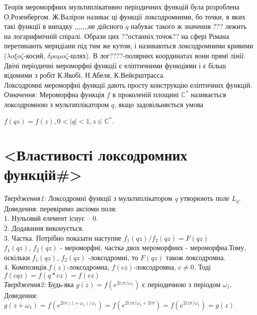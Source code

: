 \documentclass[12pt,a4paper]{article}
\begin{document}
Теорія мероморфних мультиплікативно періодичних функцій була розроблена О.Розенбергом. Ж.Валірон називає ці функції локсодромними, бо точки, в яких такі функції в випадку ,,,,,,,не дійсного $q$ набуває такого ж значення ??? лежить на логарифмічній спіралі. Образи цих ??останніх.точок?? на сфері Рімана перетинають меридіани під тим же кутом, і називаються локсодромними кривими ($\lambda o \xi o\zeta$-косий, $\delta \rho o \mu o\zeta$-шлях). В лог????-полярних координатах вони прямі лінії.\\
Двічі періодичні мероморфні функції є еліптичними функціями і є більш відомими з робіт К.Якобі, Н.Абеля, К.Вейєрштрасса.\\
Локсодромні мероморфні функції дають просту конструкцію еліптичних функцій.\\

\emph{Означення:} Мероморфна функція $f$ в проколеній площині $\mathbb{C}^{*}$ називається локсодромною з мультиплікатором $q$, якщо задовільняється умова \begin{center}
$f(qz)=f(z), 0<\vert q \vert<1, z\in \mathbb{C}^{*}.$
\end{center}

\clearpage

\section{<Властивості локсодромних функцій\#>}

\emph{Твердження1:} Локсодромні функції з мультиплікатором \textit{q} утворюють поле $L_{q}$. \\
Доведення: перевіримо аксіоми поля:\\
1. Нульовий елемент існує -- 0.\\
2. Додавання виконується.\\
3. Частка. Потрібно показати наступне $f_{1}(qz)/f_{2}(qz)=F(qz)$\\
$f_{1}(qz)$, $f_{2}(qz)$ - мероморфні, частка двох мероморфних - мероморфна.Тому, оскільки $f_{1}(qz)$, $f_{2}(qz)$ -локсодромні, то $ F(qz)$ також локсодромна.\\
4. Композиція.$f(z)$-локсодромна, $f(cz)$-локсодромна, $c \neq 0$. Тоді  $f(cqz)=f(q*cz)=f(cz)$\\

\emph{Твердження2:} Будь-яка $g(z)=f(e^{2iz\pi/\omega_{1}})$ є періодичною з періодом $\omega_{1}$.\\
Доведення: $g(  z+\omega_{1}  ) = f(  e^{  2i\pi (z+\omega_{1})  / \omega_{1}  }  ) =  f(  e^{  2iz\pi / \omega_{1}  +2i\pi } ) = f(  e^{  2iz\pi / \omega_{1}  } ) = g(z)$ \\
\end{document}
